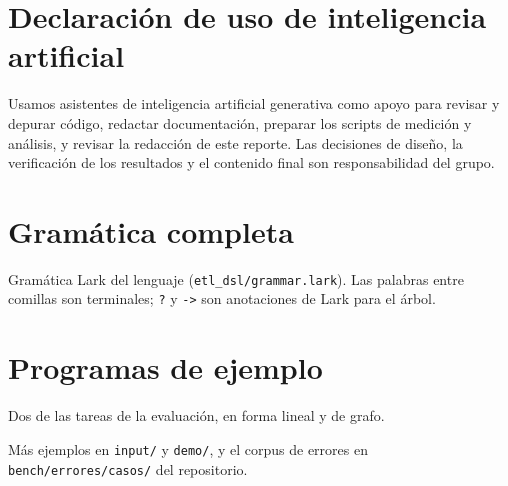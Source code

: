 \documentclass[sigplan,screen,nonacm]{acmart}
\begin{document}
\section*{Declaración de uso de inteligencia artificial}
Usamos asistentes de inteligencia artificial generativa como apoyo para revisar y depurar
código, redactar documentación, preparar los scripts de medición y análisis, y revisar la
redacción de este reporte. Las decisiones de diseño, la verificación de los resultados y el
contenido final son responsabilidad del grupo.




\appendix

\section{Gramática completa}
\label{ap:gramatica}
Gramática Lark del lenguaje (\texttt{etl\_dsl/grammar.lark}). Las palabras entre comillas son
terminales; \texttt{?} y \texttt{->} son anotaciones de Lark para el árbol.


\section{Programas de ejemplo}
\label{ap:ejemplos}
Dos de las tareas de la evaluación, en forma lineal y de grafo.


Más ejemplos en \texttt{input/} y \texttt{demo/}, y el corpus de errores en
\texttt{bench/errores/casos/} del repositorio.
\end{document}
